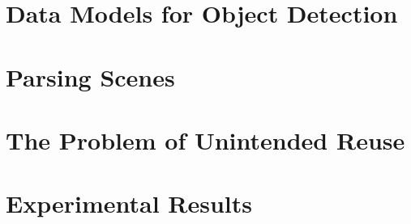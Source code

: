 \documentclass{tufte-book}
\begin{document}
    

  \section{Data Models for Object Detection}
    

  \section{Parsing Scenes}
    

  \section{The Problem of Unintended Reuse}
    

  \section{Experimental Results}
\end{document}
